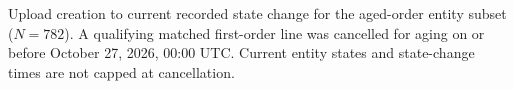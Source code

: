 Upload creation to current recorded state change for the
aged-order entity subset ($N=782$). A qualifying matched first-order line
was cancelled for aging on or before October 27, 2026, 00:00 UTC.
Current entity states and state-change times are not capped at cancellation.
